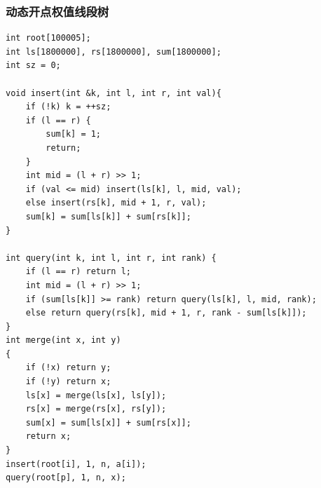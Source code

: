 \documentclass[twoside]{article}
\begin{document}
\subsubsection{动态开点权值线段树}
\begin{lstlisting}
int root[100005];
int ls[1800000], rs[1800000], sum[1800000];
int sz = 0;

void insert(int &k, int l, int r, int val){
    if (!k) k = ++sz;
    if (l == r) {
        sum[k] = 1;
        return;
    }
    int mid = (l + r) >> 1;
    if (val <= mid) insert(ls[k], l, mid, val);
    else insert(rs[k], mid + 1, r, val);
    sum[k] = sum[ls[k]] + sum[rs[k]];
}

int query(int k, int l, int r, int rank) {
    if (l == r) return l;
    int mid = (l + r) >> 1;
    if (sum[ls[k]] >= rank) return query(ls[k], l, mid, rank);
    else return query(rs[k], mid + 1, r, rank - sum[ls[k]]);
}
int merge(int x, int y)
{
    if (!x) return y;
    if (!y) return x;
    ls[x] = merge(ls[x], ls[y]);
    rs[x] = merge(rs[x], rs[y]);
    sum[x] = sum[ls[x]] + sum[rs[x]];
    return x;
}
insert(root[i], 1, n, a[i]);
query(root[p], 1, n, x);\end{lstlisting}
\end{document}
